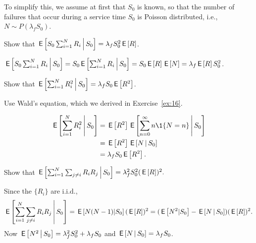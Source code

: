 To simplify this, we assume at first that $S_0$ is known, so that the number of failures that occur during a service time $S_0$ is Poisson distributed, i.e., $N\sim P(\lambda_f S_0)$.

\begin{exercise}[\faFlask]
  Show that $\,\mathsf{E}\left[S_0 \sum_{i=1}^N R_i\,\middle|\, S_0\right] = \lambda_f S_0^2 \,\mathsf{E}\left[R\right]$.
\begin{solution}
$\,\mathsf{E}\left[S_0 \sum_{i=1}^N R_i\,\middle|\, S_0\right] = 
S_0 \,\mathsf{E}\left[\sum_{i=1}^N R_i\,\middle|\, S_0\right] = S_0 \,\mathsf{E}\left[R\right] \,\mathsf{E}\left[N\right] = \lambda_f \,\mathsf{E}\left[R\right] S_0^2$.
\end{solution}
\end{exercise}

\begin{exercise}[\faFlask]
Show that $\,\mathsf{E}\left[\sum_{i=1}^N R_i^2\,\middle|\, S_0\right] = \lambda_f S_0 \,\mathsf{E}\left[R^2\right]$.
\begin{hint}
  Use Wald's equation, which we derived in Exercise~\ref{ex:16}.
\end{hint}
\begin{solution}
  \begin{align*}
    \E{\sum_{i=1}^N R_i^2\given S_0} 
&= \E{R^2}\E{ \sum_{n=0}^\infty n \1{N=n}\given S_0}\\
&= \E{R^2} \E{N\given S_0} \\
&= \lambda_f S_0 \E{R^2}.
  \end{align*}
\end{solution}
\end{exercise}

\begin{exercise}[\faCalculator]
Show that 
$\,\mathsf{E}\left[\sum_{i=1}^N \sum_{j\neq i} R_i R_j\,\middle|\, S_0\right] = \lambda_f^2 S_0^2 (\,\mathsf{E}\left[R\right])^2.$
\begin{solution}
Since the $\{R_i\}$ are i.i.d., 
  \begin{equation*}
\,\mathsf{E}\left[\sum_{i=1}^N \sum_{j\neq i} R_i R_j\,\middle|\, S_0\right]
= \,\mathsf{E}\left[N(N-1)|S_0\right] (\,\mathsf{E}\left[R\right])^2 
= (\,\mathsf{E}\left[N^2|S_0\right]-\,\mathsf{E}\left[N\,\middle|\, S_0\right]) (\,\mathsf{E}\left[R\right])^2.
  \end{equation*}
Now $\,\mathsf{E}\left[N^2\,\middle|\, S_0\right]=\lambda_f^2 S_0^2 +\lambda_f S_0$ and $\,\mathsf{E}\left[N\,\middle|\, S_0\right] = \lambda_f S_0$.
\end{solution}
\end{exercise}

